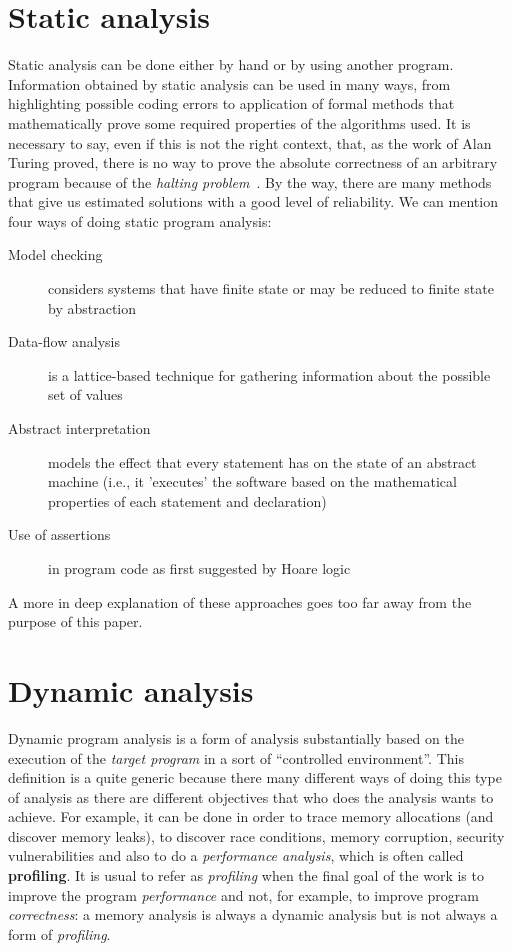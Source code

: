 \documentclass[a4paper,10pt]{report}
\begin{document}
\section{Static analysis}

Static analysis can be done either by hand or by using another program.
Information obtained by static analysis can be used in many ways, from
highlighting possible coding errors to application of formal methods that
mathematically prove some required properties of the algorithms used. It is
necessary to say, even if this is not the right context, that, as the work of
Alan Turing proved, there is no way to prove the absolute
correctness of an arbitrary program because of the \emph{halting
problem}~\cite{Turing01}.
By the way, there are many methods that give us estimated solutions with a
good level of reliability. We can mention four ways of doing static program
analysis:


\begin{description}
\item[Model checking] considers systems that have finite state or may be reduced to finite state by abstraction
\item[Data-flow analysis] is a lattice-based technique for gathering information about the possible set of values
\item[Abstract interpretation] models the effect that every statement has on the
state of an abstract machine (i.e., it 'executes' the software based on the
mathematical properties of each statement and declaration)
\item[Use of assertions] in program code as first suggested by Hoare
logic~\cite{Hoare01}
\end{description}

A more in deep explanation of these approaches goes too far away from the purpose of this paper.

\section{Dynamic analysis}

Dynamic program analysis is a form of analysis substantially based on the execution of the \emph{target program} in a sort of ``controlled environment''.
This definition is a quite generic because there many different ways of doing
this type of analysis as there are different objectives that who does the
analysis wants to achieve. For example, it can be done in order to trace memory
allocations (and discover memory leaks), to discover race conditions, memory
corruption, security vulnerabilities and also to do a \emph{performance
analysis}, which is often called \textbf{profiling}. It is usual to refer as \emph{profiling} when
the final goal of the work is to improve the program  \emph{performance} and
not, for example, to improve program \emph{correctness}: a memory analysis
is always a dynamic analysis but is not always a form of \emph{profiling}.
\end{document}
